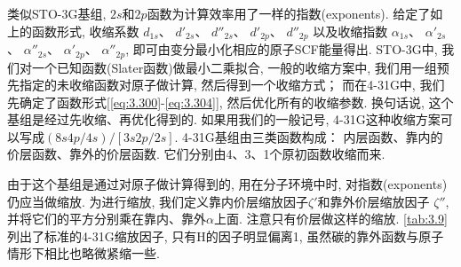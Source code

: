 类似STO-3G基组, 
$2s$和$2p$函数为计算效率用了一样的指数(exponents). 
给定了如上的函数形式, 
收缩系数
$d_{1s}$、 $d'_{2s}$、 $d''_{2s}$、 $d'_{2p}$、 $d''_{2p}$
以及收缩指数
$\alpha_{1s}$、 $\alpha'_{2s}$、 $\alpha''_{2s}$、 $\alpha'_{2p}$、 $\alpha''_{2p}$, 
即可由变分最小化相应的原子SCF能量得出. 
STO-3G中, 我们对一个已知函数(Slater函数)做最小二乘拟合, 
一般的收缩方案中, 
我们用一组预先指定的未收缩函数对原子做计算, 
然后得到一个收缩方式；
而在4-31G中, 
我们先确定了函数形式[\autoref{eq:3.300}-\autoref{eq:3.304}], 
然后优化所有的收缩参数. 
换句话说, 这个基组是经过先收缩、再优化得到的. 
如果用我们的一般记号, 
4-31G这种收缩方案可以写成$(8s4p/4s)/[3s2p/2s]$. 
4-31G基组由三类函数构成：
内层函数、靠内的价层函数、靠外的价层函数. 
它们分别由4、3、1个原初函数收缩而来. 

由于这个基组是通过对原子做计算得到的, 
用在分子环境中时, 
对指数(exponents)仍应当做缩放. 
为进行缩放, 
我们定义靠内价层缩放因子$\zeta'$和靠外价层缩放因子 $\zeta''$, 
并将它们的平方分别乘在靠内、靠外$\alpha$上面.  
注意只有价层做这样的缩放. 
\autoref{tab:3.9}列出了标准的4-31G缩放因子, 
只有H的因子明显偏离1, 
虽然碳的靠外函数与原子情形下相比也略微紧缩一些. 


